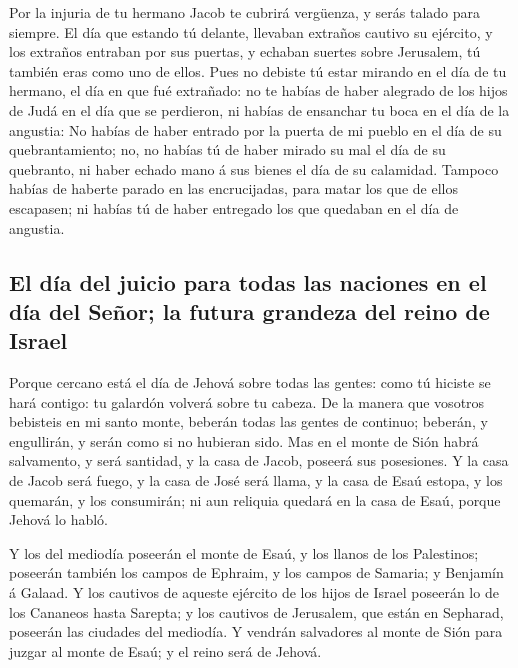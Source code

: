  Por la injuria de tu hermano Jacob te cubrirá vergüenza,
y serás talado para siempre.  El día que estando tú
delante, llevaban extraños cautivo su ejército, y los extraños entraban
por sus puertas, y echaban suertes sobre Jerusalem, tú también eras como
uno de ellos.  Pues no debiste tú estar mirando en el día
de tu hermano, el día en que fué extrañado: no te habías de haber
alegrado de los hijos de Judá en el día que se perdieron, ni habías de
ensanchar tu boca en el día de la angustia:  No habías de
haber entrado por la puerta de mi pueblo en el día de su
quebrantamiento; no, no habías tú de haber mirado su mal el día de su
quebranto, ni haber echado mano á sus bienes el día de su calamidad.
 Tampoco habías de haberte parado en las encrucijadas,
para matar los que de ellos escapasen; ni habías tú de haber entregado
los que quedaban en el día de angustia.

\hypertarget{el-duxeda-del-juicio-para-todas-las-naciones-en-el-duxeda-del-seuxf1or-la-futura-grandeza-del-reino-de-israel}{%
\subsection{El día del juicio para todas las naciones en el día del
Señor; la futura grandeza del reino de
Israel}\label{el-duxeda-del-juicio-para-todas-las-naciones-en-el-duxeda-del-seuxf1or-la-futura-grandeza-del-reino-de-israel}}

 Porque cercano está el día de Jehová sobre todas las
gentes: como tú hiciste se hará contigo: tu galardón volverá sobre tu
cabeza.  De la manera que vosotros bebisteis en mi santo
monte, beberán todas las gentes de continuo; beberán, y engullirán, y
serán como si no hubieran sido.  Mas en el monte de Sión
habrá salvamento, y será santidad, y la casa de Jacob, poseerá sus
posesiones.  Y la casa de Jacob será fuego, y la casa de
José será llama, y la casa de Esaú estopa, y los quemarán, y los
consumirán; ni aun reliquia quedará en la casa de Esaú, porque Jehová lo
habló.

 Y los del mediodía poseerán el monte de Esaú, y los
llanos de los Palestinos; poseerán también los campos de Ephraim, y los
campos de Samaria; y Benjamín á Galaad.  Y los cautivos
de aqueste ejército de los hijos de Israel poseerán lo de los Cananeos
hasta Sarepta; y los cautivos de Jerusalem, que están en Sepharad,
poseerán las ciudades del mediodía.  Y vendrán salvadores
al monte de Sión para juzgar al monte de Esaú; y el reino será de
Jehová.
